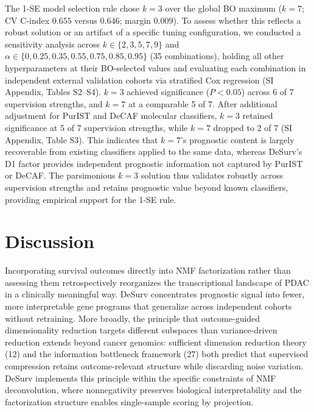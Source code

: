 \documentclass[9pt,twocolumn,twoside,]{pnas-new}
\begin{document}
The 1-SE model selection rule chose \(k = 3\) over the global BO maximum
(\(k = 7\); CV C-index \(0.655\) versus \(0.646\); margin \(0.009\)). To
assess whether this reflects a robust solution or an artifact of a
specific tuning configuration, we conducted a sensitivity analysis
across \(k \in \{2, 3, 5, 7, 9\}\) and
\(\alpha \in \{0, 0.25, 0.35, 0.55, 0.75, 0.85, 0.95\}\) (35
combinations), holding all other hyperparameters at their BO-selected
values and evaluating each combination in independent external
validation cohorts via stratified Cox regression (SI Appendix, Tables
S2--S4). \(k = 3\) achieved significance (\(P < 0.05\)) across 6 of 7
supervision strengths, and \(k = 7\) at a comparable 5 of 7. After
additional adjustment for PurIST and DeCAF molecular classifiers,
\(k = 3\) retained significance at 5 of 7 supervision strengths, while
\(k = 7\) dropped to 2 of 7 (SI Appendix, Table S3). This indicates that
\(k = 7\)'s prognostic content is largely recoverable from existing
classifiers applied to the same data, whereas DeSurv's D1 factor
provides independent prognostic information not captured by PurIST or
DeCAF. The parsimonious \(k = 3\) solution thus validates robustly
across supervision strengths and retains prognostic value beyond known
classifiers, providing empirical support for the 1-SE rule.

\section*{Discussion}\label{discussion}

Incorporating survival outcomes directly into NMF factorization rather
than assessing them retrospectively reorganizes the transcriptional
landscape of PDAC in a clinically meaningful way. DeSurv concentrates
prognostic signal into fewer, more interpretable gene programs that
generalize across independent cohorts without retraining. More broadly,
the principle that outcome-guided dimensionality reduction targets
different subspaces than variance-driven reduction extends beyond cancer
genomics: sufficient dimension reduction theory (12) and the information
bottleneck framework (27) both predict that supervised compression
retains outcome-relevant structure while discarding noise variation.
DeSurv implements this principle within the specific constraints of NMF
deconvolution, where nonnegativity preserves biological interpretability
and the factorization structure enables single-sample scoring by
projection.
\end{document}
